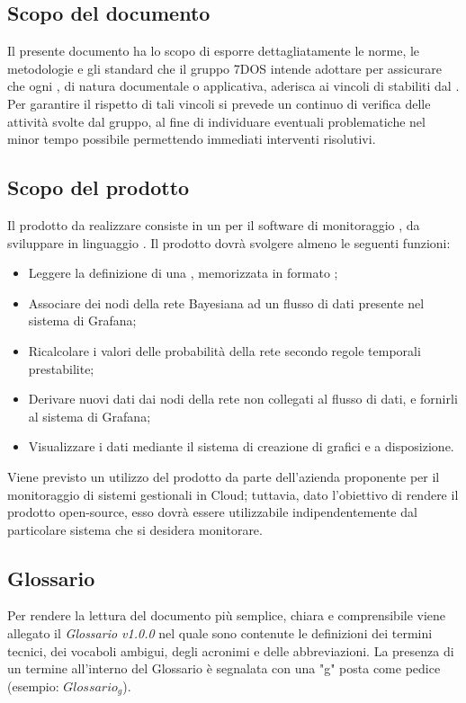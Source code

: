 \subsection{Scopo del documento}
Il presente documento ha lo scopo di esporre dettagliatamente le norme, le metodologie e gli standard che il gruppo 7DOS intende adottare per assicurare che ogni , di natura documentale o applicativa, aderisca ai vincoli di  stabiliti dal . Per garantire il rispetto di tali vincoli si prevede un continuo  di verifica delle attività svolte dal gruppo, al fine di individuare eventuali problematiche nel minor tempo possibile permettendo immediati interventi risolutivi.
\subsection{Scopo del prodotto}
Il prodotto da realizzare consiste in un  per il software di monitoraggio , da sviluppare in linguaggio . Il prodotto dovrà svolgere almeno le seguenti funzioni:
\begin{itemize}
	\item{Leggere la definizione di una , memorizzata in formato ;}
	\item{Associare dei nodi della rete Bayesiana ad un flusso di dati presente nel sistema di Grafana;}
	\item{Ricalcolare i valori delle probabilità della rete secondo regole temporali prestabilite;}
	\item{Derivare nuovi dati dai nodi della rete non collegati al flusso di dati, e fornirli al sistema di Grafana;}
	\item{Visualizzare i dati mediante il sistema di creazione di grafici e  a disposizione.}
\end{itemize}
Viene previsto un utilizzo del prodotto da parte dell'azienda proponente per il monitoraggio di sistemi gestionali in Cloud; tuttavia, dato l'obiettivo di rendere il prodotto open-source, esso dovrà essere utilizzabile indipendentemente dal particolare sistema che si desidera monitorare.
\subsection{Glossario}
Per rendere la lettura del documento più semplice, chiara e comprensibile viene allegato il \emph{Glossario v1.0.0} nel quale sono contenute le definizioni dei termini tecnici, dei vocaboli ambigui, degli acronimi e delle abbreviazioni. La presenza di un termine all'interno del Glossario è segnalata con una "g" posta come pedice (esempio: $Glossario_{g}$).  
